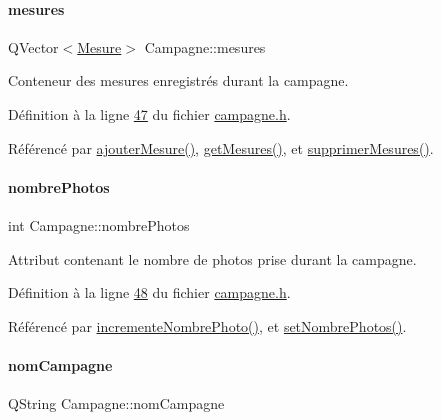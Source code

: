 \paragraph{\texorpdfstring{mesures}{mesures}}
{\footnotesize\ttfamily Q\+Vector$<$\hyperlink{struct_mesure}{Mesure}$>$ Campagne\+::mesures\hspace{0.3cm}{\ttfamily [private]}}



Conteneur des mesures enregistrés durant la campagne. 



Définition à la ligne \hyperlink{campagne_8h_source_l00047}{47} du fichier \hyperlink{campagne_8h_source}{campagne.\+h}.



Référencé par \hyperlink{campagne_8cpp_source_l00090}{ajouter\+Mesure()}, \hyperlink{campagne_8cpp_source_l00075}{get\+Mesures()}, et \hyperlink{campagne_8cpp_source_l00095}{supprimer\+Mesures()}.

\mbox{\label{class_campagne_a3696e02e3cefc30bf4f284152917718b}} 
\paragraph{\texorpdfstring{nombre\+Photos}{nombrePhotos}}
{\footnotesize\ttfamily int Campagne\+::nombre\+Photos\hspace{0.3cm}{\ttfamily [private]}}



Attribut contenant le nombre de photos prise durant la campagne. 



Définition à la ligne \hyperlink{campagne_8h_source_l00048}{48} du fichier \hyperlink{campagne_8h_source}{campagne.\+h}.



Référencé par \hyperlink{campagne_8cpp_source_l00105}{incremente\+Nombre\+Photo()}, et \hyperlink{campagne_8cpp_source_l00065}{set\+Nombre\+Photos()}.

\mbox{\label{class_campagne_a4455078418041442fa3998b9b6cb6230}} 
\paragraph{\texorpdfstring{nom\+Campagne}{nomCampagne}}
{\footnotesize\ttfamily Q\+String Campagne\+::nom\+Campagne\hspace{0.3cm}{\ttfamily [private]}}



